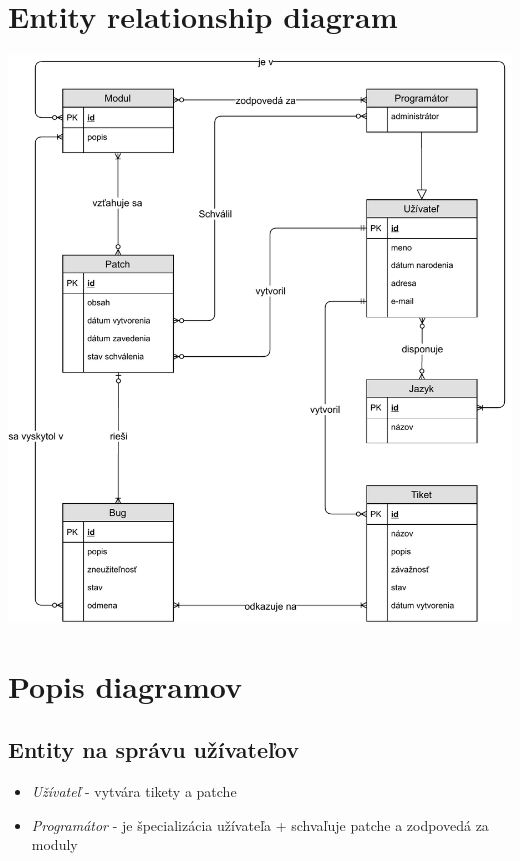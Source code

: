 \documentclass[11pt, a4paper]{article}
\begin{document}
	\section{Entity relationship diagram}
	\label{sec:entity-relationship-diagram}
	\begin{center}
		\vspace*{\fill}
		\includegraphics[width=0.95\linewidth]{ER_diagram.pdf}
		\vspace*{\fill}
	\end{center}

	\newpage
	\section{Popis diagramov}
	\label{sec:popis-diagramov}
	\subsection{Entity na správu užívateľov}
	\label{subsec:entity-na-správu-užívateľov}

	\begin{itemize}
	\item \emph{Užívateľ} - vytvára tikety a patche
	\item \emph{Programátor} - je špecializácia užívateľa + schvaľuje patche a zodpovedá za moduly
	\end{itemize}
\end{document}
